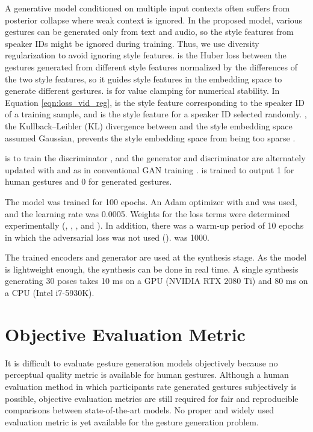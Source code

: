 \documentclass[acmtog]{acmart}
\begin{document}
A generative model conditioned on multiple input contexts often suffers from posterior collapse where weak context is ignored. In the proposed model, various gestures can be generated only from text and audio, so the style features from speaker IDs might be ignored during training. Thus, we use diversity regularization \cite{yang2019diversity} to avoid ignoring style features.  is the Huber loss between the gestures generated from different style features normalized by the differences of the two style features, so it guides style features in the embedding space to generate different gestures.  is for value clamping for numerical stability. In Equation \ref{eqn:loss_vid_reg},  is the style feature corresponding to the speaker ID of a training sample, and  is the style feature for a speaker ID selected randomly. , the Kullback–Leibler (KL) divergence between  and the style embedding space assumed Gaussian, prevents the style embedding space from being too sparse \cite{kingma2013auto}.

 is to train the discriminator , and the generator and discriminator are alternately updated with  and  as in conventional GAN training \cite{goodfellow2014generative}.  is trained to output 1 for human gestures and 0 for generated gestures.

The model was trained for 100 epochs. An Adam optimizer with  and  was used, and the learning rate was 0.0005. Weights for the loss terms were determined experimentally (, , , and ). In addition, there was a warm-up period of 10 epochs in which the adversarial loss was not used ().  was 1000.

The trained encoders and generator are used at the synthesis stage. As the model is lightweight enough, the synthesis can be done in real time. A single synthesis generating 30 poses takes 10 ms on a GPU (NVIDIA RTX 2080 Ti) and 80 ms on a CPU (Intel i7-5930K). \section{Objective Evaluation Metric} \label{sec:metric}
It is difficult to evaluate gesture generation models objectively because no perceptual quality metric is available for human gestures. Although a human evaluation method in which participants rate generated gestures subjectively is possible, objective evaluation metrics are still required for fair and reproducible comparisons between state-of-the-art models. No proper and widely used evaluation metric is yet available for the gesture generation problem. 
\end{document}
